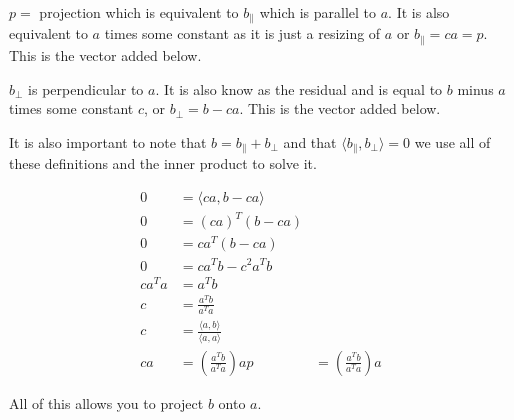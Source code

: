 $p =$ projection which is equivalent to $b_\|$ which is parallel to $a$. It is also equivalent to $a$ times some constant as it is just a resizing of $a$ or $b_\| = ca = p$. This is the vector added below.


$b_\perp$ is perpendicular to $a$. It is also know as the residual and is equal to $b$ minus $a$ times some constant $c$, or $b_\perp = b-ca$. This is the vector added below.


It is also important to note that $b = b_\| + b_\perp$ and that $\langle b_\| , b_\perp \rangle = 0$ we use all of these definitions and the inner product to solve it.

\begin{align*}
	0 &= \langle ca, b-ca \rangle \\
	0 &= (ca)^T(b-ca) \\
	0 &= ca^T (b-ca) \\
	0 &= ca^Tb-c^2a^Tb \\
	ca^Ta  &= a^Tb \\
	c &= \frac{a^Tb}{a^Ta} \\
	c &= \frac{\langle a,b \rangle}{\langle a,a \rangle} \\
	ca &=  (\frac{a^Tb}{a^Ta})a 
 	p &=   (\frac{a^Tb}{a^Ta})a
\end{align*}

All of this allows you to project $b$ onto $a$.

